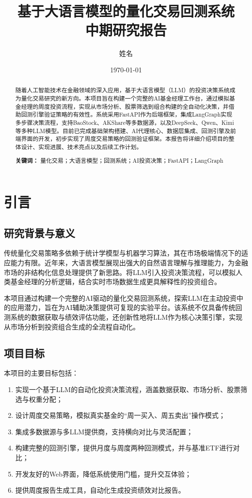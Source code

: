 \documentclass[12pt,a4paper]{ctexart}
\title{基于大语言模型的量化交易回测系统\\中期研究报告}
\author{姓名}
\date{\today}
\begin{document}
\maketitle

\begin{abstract}
随着人工智能技术在金融领域的深入应用，基于大语言模型（LLM）的投资决策系统成为量化交易研究的新方向。本项目旨在构建一个完整的AI基金经理工作台，通过模拟基金经理的周度投资流程，实现从市场分析、股票筛选到组合构建的全自动化决策，并借助回测引擎验证策略的有效性。系统采用FastAPI作为后端框架，集成LangGraph实现多步骤决策流程，支持BaoStock、AKShare等多数据源，以及DeepSeek、Qwen、Kimi等多种LLM模型。目前已完成基础架构搭建、AI代理核心、数据层集成、回测引擎及前端界面的开发，初步实现了周度交易策略的回测验证框架。本报告将详细介绍项目的整体设计、实现进展、技术亮点以及后续工作计划。

\textbf{关键词：} 量化交易；大语言模型；回测系统；AI投资决策；FastAPI；LangGraph
\end{abstract}

\newpage

\tableofcontents

\newpage

\section{引言}

\subsection{研究背景与意义}

传统量化交易策略多依赖于统计学模型与机器学习算法，其在市场极端情况下的适应能力有限。近年来，大语言模型展现出强大的自然语言理解与推理能力，为金融市场的非结构化信息处理提供了新思路。将LLM引入投资决策流程，可以模拟人类基金经理的分析逻辑，结合实时市场数据生成更具解释性的投资组合。

本项目通过构建一个完整的AI驱动的量化交易回测系统，探索LLM在主动投资中的应用潜力，旨在为AI辅助决策提供可复现的实验平台。该系统不仅具备传统回测系统的数据获取与绩效评估功能，还创新性地将LLM作为核心决策引擎，实现从市场分析到投资组合生成的全流程自动化。

\subsection{项目目标}

本项目的主要目标包括：

\begin{enumerate}
    \item 实现一个基于LLM的自动化投资决策流程，涵盖数据获取、市场分析、股票筛选与权重分配；
    \item 设计周度交易策略，模拟真实基金的“周一买入、周五卖出”操作模式；
    \item 集成多数据源与多LLM提供商，支持横向对比与灵活配置；
    \item 构建完整的回测引擎，提供月度与周度两种回测模式，并与基准ETF进行对比；
    \item 开发友好的Web界面，降低系统使用门槛，提升交互体验；
    \item 提供周度报告生成工具，自动化生成投资绩效对比报告。
\end{enumerate}
\end{document}

